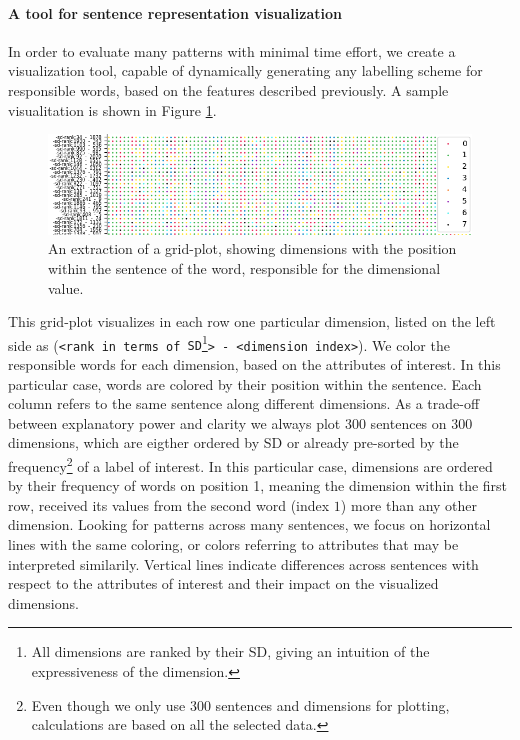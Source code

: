 \paragraph*{A tool for sentence representation visualization}
In order to evaluate many patterns with minimal time effort, we create a visualization tool, capable of dynamically generating any labelling scheme for responsible words, based on the features described previously. A sample visualitation is shown in Figure \ref{fig:find_position_1}.
\begin{figure}[tph!]
\centering
	\includegraphics[totalheight=4cm]{fig/finpone.png}
	\caption{An extraction of a grid-plot, showing dimensions with the position within the sentence of the word, responsible for the dimensional value.}
	\label{fig:find_position_1}
\end{figure}
This grid-plot visualizes in each row one particular dimension, listed on the left side as (\texttt{<rank in terms of \ac{SD}}\footnote{All dimensions are ranked by their \ac{SD}, giving an intuition of the expressiveness of the dimension.}\texttt{> - <dimension index>}). We color the responsible words for each dimension, based on the attributes of interest. In this particular case, words are colored by their position within the sentence.  Each column refers to the same sentence along different dimensions. As a trade-off between explanatory power and clarity we always plot 300 sentences on 300 dimensions, which are eigther ordered by \ac{SD} or already pre-sorted by the frequency\footnote{Even though we only use 300 sentences and dimensions for plotting, calculations are based on all the selected data.} of a label of interest. In this particular case, dimensions are ordered by their frequency of words on position 1, meaning the dimension within the first row, received its values from the second word (index $1$) more than any other dimension. Looking for patterns across many sentences, we focus on horizontal lines with the same coloring, or colors referring to attributes that may be interpreted similarily. Vertical lines indicate differences across sentences with respect to the attributes of interest and their impact on the visualized dimensions.


